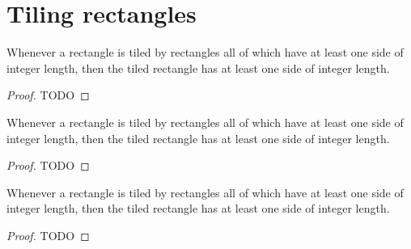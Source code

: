\chapter{Tiling rectangles}

\begin{theorem}
  \label{tiling_rectangles1}
  Whenever a rectangle is tiled by rectangles all of which have at least
  one side of integer length, then the tiled rectangle has
  at least one side of integer length.
\end{theorem}
\begin{proof}
  TODO
\end{proof}

\begin{theorem}
  \label{tiling_rectangles2}
  Whenever a rectangle is tiled by rectangles all of which have at least
  one side of integer length, then the tiled rectangle has
  at least one side of integer length.
\end{theorem}
\begin{proof}
  TODO
\end{proof}

\begin{theorem}
  \label{tiling_rectangles3}
  Whenever a rectangle is tiled by rectangles all of which have at least
  one side of integer length, then the tiled rectangle has
  at least one side of integer length.
\end{theorem}
\begin{proof}
  TODO
\end{proof}
